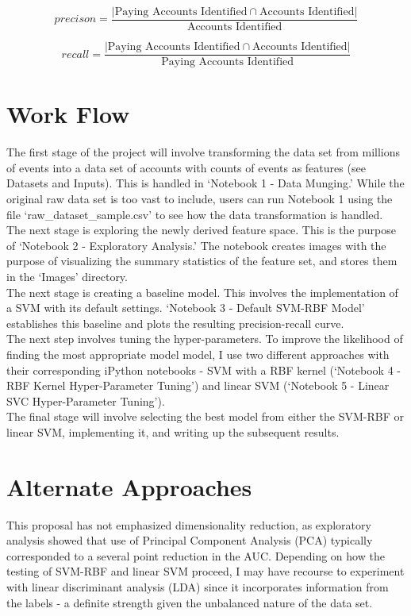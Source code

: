 \documentclass{article} %
\begin{document}
\[precison =  \displaystyle\frac{|\text{Paying Accounts Identified}\cap\text{Accounts Identified}|}{\text{Accounts Identified}}\]

\[recall =  \displaystyle\frac{|\text{Paying Accounts Identified}\cap\text{Accounts Identified}|}{\text{Paying Accounts Identified}}\]


\section{Work Flow}
\indent\indent The first stage of the project will involve transforming the data set from millions of events into a data set of accounts with counts of events as features (see Datasets and Inputs). This is handled in `Notebook 1 - Data Munging.' While the original raw data set is too vast to include, users can run Notebook 1 using the file `raw\_dataset\_sample.csv' to see how the data transformation is handled.\\
\indent The next stage is exploring the newly derived feature space. This is the purpose of `Notebook 2 - Exploratory Analysis.' The notebook creates images with the purpose of visualizing the summary statistics of the feature set, and stores them in the `Images' directory. \\
\indent The next stage is creating a baseline model. This involves the
implementation of a SVM with its default settings. `Notebook 3 - Default SVM-RBF Model' establishes this baseline and plots the resulting precision-recall curve.\\
\indent The next step involves tuning the hyper-parameters. To improve the likelihood of finding the most appropriate model model, I use two different approaches with their corresponding iPython notebooks - SVM with a RBF kernel (`Notebook 4 - RBF Kernel Hyper-Parameter Tuning') and linear SVM 
(`Notebook 5 - Linear SVC  Hyper-Parameter Tuning').\\
\indent The final stage will involve selecting the best model from either the SVM-RBF or linear SVM, implementing it, and writing up the subsequent results.\\

\section{Alternate Approaches}
\indent\indent This proposal has not emphasized dimensionality reduction, as exploratory analysis showed that use of Principal Component Analysis (PCA) typically corresponded to a several point reduction in the AUC. Depending on how the testing of SVM-RBF and linear SVM proceed, I may have recourse to experiment with linear discriminant analysis (LDA) since it incorporates information from the labels - a definite strength given the unbalanced nature of the data set. 
\end{document}
